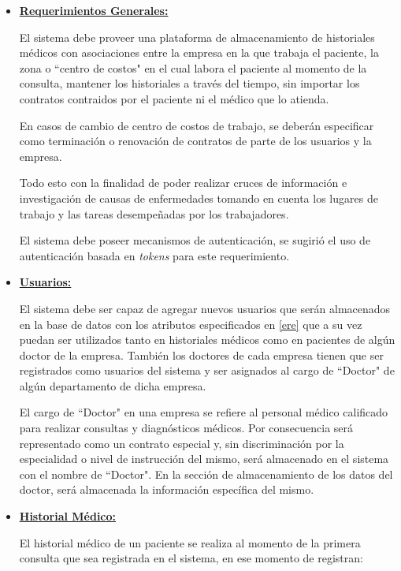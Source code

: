     \begin{itemize}
        \item \textbf{\underline{Requerimientos Generales:}}
        
        El sistema debe proveer una plataforma de almacenamiento de historiales médicos con asociaciones entre la empresa en la que trabaja el paciente, la zona o ``centro de costos" en el cual labora el paciente al momento de la consulta, mantener los historiales a través del tiempo, sin importar los contratos contraidos por el paciente ni el médico que lo atienda.
        
        En casos de cambio de centro de costos de trabajo, se deberán especificar como terminación o renovación de contratos de parte de los usuarios y la empresa.
        
        Todo esto con la finalidad de poder realizar cruces de información e investigación de causas de enfermedades tomando en cuenta los lugares de trabajo y las tareas desempeñadas por los trabajadores.
        
        El sistema debe poseer mecanismos de autenticación, se sugirió el uso de autenticación basada en \textit{tokens} para este requerimiento.
        
        \item \textbf{\underline{Usuarios:}}
        
        El sistema debe ser capaz de agregar nuevos usuarios que serán almacenados en la base de datos con los atributos especificados en \ref{ere} que a su vez puedan ser utilizados tanto en historiales médicos como en pacientes de algún doctor de la empresa. También los doctores de cada empresa tienen que ser registrados como usuarios del sistema y ser asignados al cargo de ``Doctor" de algún departamento de dicha empresa.
        
        El cargo de ``Doctor" en una empresa se refiere al personal médico calificado para realizar consultas y diagnósticos médicos. Por consecuencia será representado como un contrato especial y, sin discriminación por la especialidad o nivel de instrucción del mismo, será almacenado en el sistema con el nombre de ``Doctor". En la sección de almacenamiento de los datos del doctor, será  almacenada la información específica del mismo.
        
        \item \textbf{\underline{Historial Médico:}}
        
        El historial médico de un paciente se realiza al momento de la primera consulta que sea registrada en el sistema, en ese momento de registran:
        

\end{itemize}
